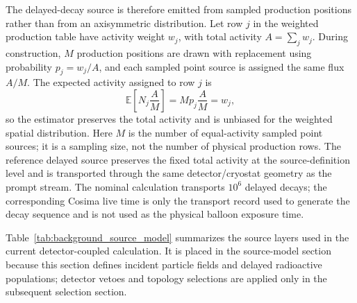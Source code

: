 \documentclass[11pt]{article}
\begin{document}
The delayed-decay source is therefore emitted from sampled production positions
rather than from an axisymmetric distribution. Let row $j$ in the weighted
production table have activity weight $w_j$, with total activity
$A=\sum_j w_j$. During construction, $M$ production positions are drawn with
replacement using probability $p_j=w_j/A$, and each sampled point source is
assigned the same flux $A/M$. The expected activity assigned to row $j$ is
\begin{equation}
  \mathbb{E}\!\left[N_j\frac{A}{M}\right] = M p_j \frac{A}{M} = w_j ,
\end{equation}
so the estimator preserves the total activity and is unbiased for the weighted
spatial distribution. Here $M$ is the number of equal-activity sampled point
sources; it is a sampling size, not the number of physical production rows. The
reference delayed source preserves the fixed total activity at the
source-definition level and is transported through the same detector/cryostat
geometry as the prompt stream. The nominal calculation transports $10^6$
delayed decays; the corresponding Cosima live time is only the transport record
used to generate the decay sequence and is not used as the physical balloon
exposure time.

Table~\ref{tab:background_source_model} summarizes the source layers used in the
current detector-coupled calculation. It is placed in the source-model section
because this section defines incident particle fields and delayed radioactive
populations; detector vetoes and topology selections are applied only in the
subsequent selection section.
\end{document}
